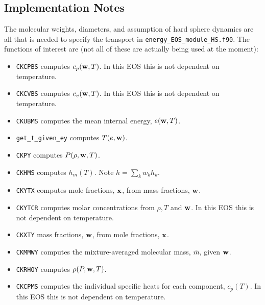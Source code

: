 \documentclass[final]{siamltex}
\def\wb {{\bf w}}
\def\xb {{\bf x}}
\begin{document}
\subsection{Implementation Notes}
The molecular weights, diameters, and assumption of hard sphere dynamics
 are all that is needed to specify the transport in
{\tt energy\_EOS\_module\_HS.f90}.  The functions of interest are
(not all of these are actually being used at the moment):\\
\begin{itemize}

\item {\tt CKCPBS} computes $c_p(\wb,T)$.  In this EOS this is not dependent on temperature.\\

\item {\tt CKCVBS} computes $c_v(\wb,T)$.  In this EOS this is not dependent on temperature.\\

\item {\tt CKUBMS} computes the mean internal energy, $e(\wb,T)$.\\

\item {\tt get\_t\_given\_ey} computes $T(e,\wb)$.\\

\item {\tt CKPY} computes $P(\rho,\wb,T)$.\\

\item {\tt CKHMS} computes $h_m(T)$.  Note $h = \sum_k w_k h_k$.\\

\item {\tt CKYTX} computes mole fractions, $\xb$, from mass fractions, $\wb$.\\

\item {\tt CKYTCR} computes molar concentrations from $\rho,T$ and $\wb$.
In this EOS this is not dependent on temperature.\\

\item {\tt CKXTY} mass fractions, $\wb$, from mole fractions, $\xb$.\\

\item {\tt CKMMWY} computes the mixture-averaged molecular mass, $\bar{m}$, given $\wb$.\\

\item {\tt CKRHOY} computes $\rho(P,\wb,T)$.\\

\item {\tt CKCPMS} computes the individual specific heats for each component,
$c_p(T)$.  In this EOS this is not dependent on temperature.\\

\end{itemize}
\end{document}
